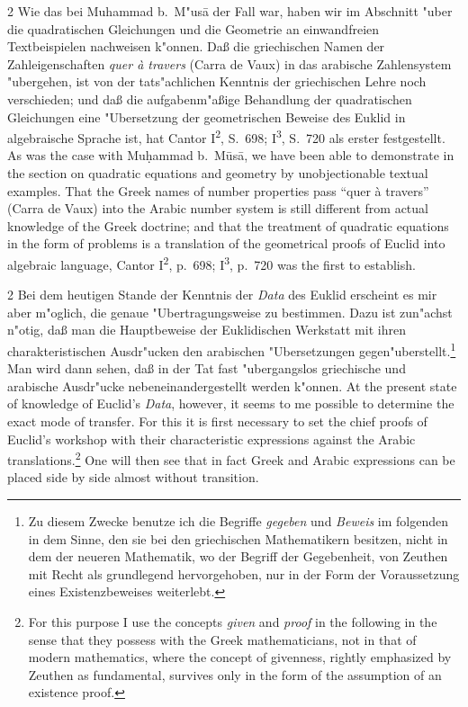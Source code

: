 \documentclass[10pt,a4paper]{article}
\renewcommand{\switchcolumn}{\syncronize\nointerlineskip\columnbreak}
\begin{document}
\begin{paracol}{2}
Wie das bei Muhammad b.\ M"us\=a der Fall war, haben wir im Abschnitt "uber die quadratischen Gleichungen und die Geometrie an einwandfreien Textbeispielen nachweisen k"onnen. Da\ss{} die griechischen Namen der Zahleigenschaften \textit{quer \`a travers} (Carra de Vaux) in das arabische Zahlensystem "ubergehen, ist von der tats"achlichen Kenntnis der griechischen Lehre noch verschieden; und da\ss{} die aufgabenm"a\ss{}ige Behandlung der quadratischen Gleichungen eine "Ubersetzung der geometrischen Beweise des Euklid in algebraische Sprache ist, hat Cantor I\textsuperscript{2}, S.\ 698; I\textsuperscript{3}, S.\ 720 als erster festgestellt.
\switchcolumn
As was the case with Mu\d{h}ammad b.\ M\=us\=a, we have been able to demonstrate in the section on quadratic equations and geometry by unobjectionable textual examples. That the Greek names of number properties pass ``quer \`a travers'' (Carra de Vaux) into the Arabic number system is still different from actual knowledge of the Greek doctrine; and that the treatment of quadratic equations in the form of problems is a translation of the geometrical proofs of Euclid into algebraic language, Cantor I\textsuperscript{2}, p.\ 698; I\textsuperscript{3}, p.\ 720 was the first to establish.
\end{paracol}

\begin{paracol}{2}
Bei dem heutigen Stande der Kenntnis der \textit{Data} des Euklid erscheint es mir aber m"oglich, die genaue "Ubertragungsweise zu bestimmen. Dazu ist zun"achst n"otig, da\ss{} man die Hauptbeweise der Euklidischen Werkstatt mit ihren charakteristischen Ausdr"ucken den arabischen "Ubersetzungen gegen"uberstellt.\footnote{Zu diesem Zwecke benutze ich die Begriffe \textit{gegeben} und \textit{Beweis} im folgenden in dem Sinne, den sie bei den griechischen Mathematikern besitzen, nicht in dem der neueren Mathematik, wo der Begriff der Gegebenheit, von Zeuthen mit Recht als grundlegend hervorgehoben, nur in der Form der Voraussetzung eines Existenzbeweises weiterlebt.} Man wird dann sehen, da\ss{} in der Tat fast "ubergangslos griechische und arabische Ausdr"ucke nebeneinandergestellt werden k"onnen.
\switchcolumn
At the present state of knowledge of Euclid's \textit{Data}, however, it seems to me possible to determine the exact mode of transfer. For this it is first necessary to set the chief proofs of Euclid's workshop with their characteristic expressions against the Arabic translations.\footnote{For this purpose I use the concepts \textit{given} and \textit{proof} in the following in the sense that they possess with the Greek mathematicians, not in that of modern mathematics, where the concept of givenness, rightly emphasized by Zeuthen as fundamental, survives only in the form of the assumption of an existence proof.} One will then see that in fact Greek and Arabic expressions can be placed side by side almost without transition.
\end{paracol}
\end{document}
